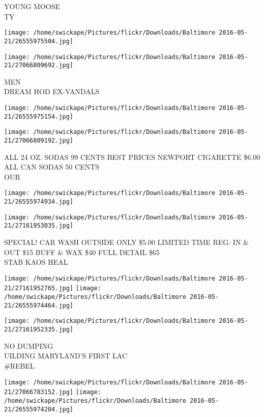 \documentclass[10pt,letterpaper]{article}
\begin{document}
YOUNG MOOSE\\
TY
\pagebreak

\texttt{[image: /home/swickape/Pictures/flickr/Downloads/Baltimore 2016-05-21/26555975504.jpg]}

\vspace{0.25in}
\texttt{[image: /home/swickape/Pictures/flickr/Downloads/Baltimore 2016-05-21/27066809692.jpg]}

MEN\\
DREAM HOD EX{-}VANDALS
\pagebreak

\texttt{[image: /home/swickape/Pictures/flickr/Downloads/Baltimore 2016-05-21/26555975154.jpg]}

\vspace{0.25in}
\texttt{[image: /home/swickape/Pictures/flickr/Downloads/Baltimore 2016-05-21/27066809192.jpg]}

ALL 24 OZ. SODAS 99 CENTS BEST PRICES NEWPORT CIGARETTE \$6.00 ALL CAN SODAS 50 CENTS\\
OUR
\pagebreak

\texttt{[image: /home/swickape/Pictures/flickr/Downloads/Baltimore 2016-05-21/26555974934.jpg]}

\vspace{0.25in}
\texttt{[image: /home/swickape/Pictures/flickr/Downloads/Baltimore 2016-05-21/27161953035.jpg]}

SPECIAL!  CAR WASH OUTSIDE ONLY \$5.00 LIMITED TIME REG: IN \& OUT \$15 BUFF \& WAX \$40 FULL DETAIL \$65\\
STAB KAOS HEAL
\pagebreak

\texttt{[image: /home/swickape/Pictures/flickr/Downloads/Baltimore 2016-05-21/27161952765.jpg]}
\texttt{[image: /home/swickape/Pictures/flickr/Downloads/Baltimore 2016-05-21/26555974464.jpg]}

\vspace{0.25in}
\texttt{[image: /home/swickape/Pictures/flickr/Downloads/Baltimore 2016-05-21/27161952335.jpg]}

NO DUMPING\\
UILDING MARYLAND'S FIRST LAC\\
\#REBEL
\pagebreak

\texttt{[image: /home/swickape/Pictures/flickr/Downloads/Baltimore 2016-05-21/27066783152.jpg]}
\texttt{[image: /home/swickape/Pictures/flickr/Downloads/Baltimore 2016-05-21/26555974204.jpg]}
\end{document}
